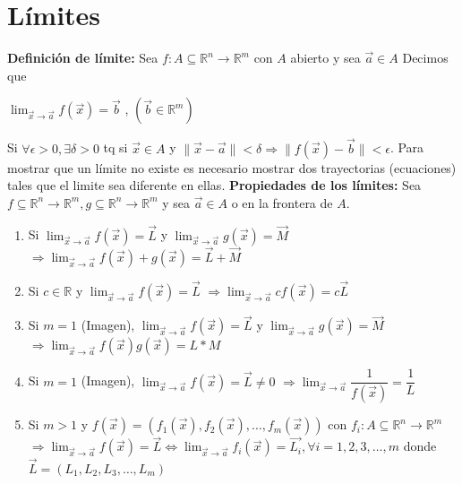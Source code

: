 \documentclass[12pt]{article}
\begin{document}
\section*{Límites}
\noindent\textbf{Definición de límite:} Sea $f:A\subseteq\mathbb{R}^n\rightarrow\mathbb{R}^m$ con $A$ abierto y 
sea $\vec{a}\in A$\newline
Decimos que
\begin{center}
    $\lim_{\vec{x}\rightarrow\vec{a}}{f(\vec{x})} = \vec{b}$ , $(\vec{b}\in\mathbb{R}^m)$ 
\end{center}
\noindent Si $\forall \epsilon>0, \exists \delta >0 $ tq si $\vec{x}\in A$ y $\|\vec{x}-\vec{a}\| < \delta \Rightarrow  \|f(\vec{x})-\vec{b}\| < \epsilon$.\newline
Para mostrar que un límite no existe es necesario mostrar dos trayectorias (ecuaciones) tales que el limite sea diferente en ellas.
\newline
\newline
\textbf{Propiedades de los límites: }\newline
\noindent Sea $f\subseteq\mathbb{R}^n\rightarrow\mathbb{R}^m, g\subseteq\mathbb{R}^n\rightarrow\mathbb{R}^m$ y sea $\vec{a}\in A$ o en la frontera de $A$.
\begin{enumerate}
    \item Si $\lim_{\vec{x}\rightarrow\vec{a}}{f(\vec{x})}=\vec{L}$ y $\lim_{\vec{x}\rightarrow\vec{a}}{g(\vec{x})}=\vec{M}$\newline
            $\Rightarrow\lim_{\vec{x}\rightarrow\vec{a}}{f(\vec{x})+g(\vec{x})}=\vec{L}+\vec{M}$
    \item Si $c\in\mathbb{R}$ y $\lim_{\vec{x}\rightarrow\vec{a}}{f(\vec{x})}=\vec{L}$\newline
            $\Rightarrow\lim_{\vec{x}\rightarrow\vec{a}}{cf(\vec{x})}=c\vec{L}$
    \item Si $m=1$ (Imagen), $\lim_{\vec{x}\rightarrow\vec{a}}{f(\vec{x})}=\vec{L}$ y $\lim_{\vec{x}\rightarrow\vec{a}}{g(\vec{x})}=\vec{M}$\newline
            $\Rightarrow\lim_{\vec{x}\rightarrow\vec{a}}{f(\vec{x})g(\vec{x})}=L*M$
    \item Si $m=1$ (Imagen), $\lim_{\vec{x}\rightarrow\vec{a}}{f(\vec{x})}=\vec{L} \not=0$\newline
            $\Rightarrow\lim_{\vec{x}\rightarrow\vec{a}}{ \dfrac{1}{f(\vec{x})} }=\dfrac{1}{L}$
    \item Si $m>1$ y $f(\vec{x})=\left( f_1(\vec{x}),f_2(\vec{x}), \dots, f_m(\vec{x})\right)\text{ con } f_i:A\subseteq\mathbb{R}^n\rightarrow\mathbb{R}^m$\newline
            $\Rightarrow \lim_{\vec{x}\rightarrow\vec{a}}{f(\vec{x})}=\vec{L}\Leftrightarrow\lim_{\vec{x}\rightarrow\vec{a}}{f_i(\vec{x})}=\vec{L_i}, \forall i=1,2,3,\dots,m$ donde $\vec{L}=(L_1,L_2,L_3,\dots, L_m)$
\end{enumerate}
\newpage
\end{document}
